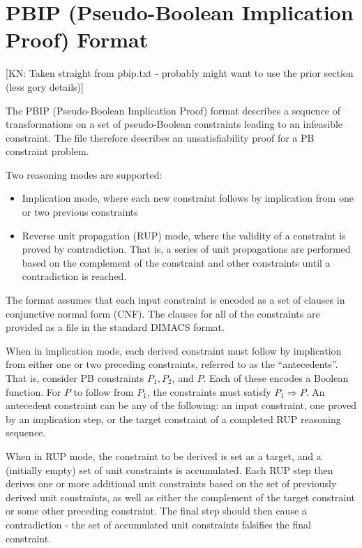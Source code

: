 \message{ !name(FMCAD2024.tex)}\documentclass{fmcad}
\begin{document}
\section{PBIP (Pseudo-Boolean Implication Proof) Format}

[KN: Taken straight from pbip.txt - probably might want to use the prior section (less gory details)]

The PBIP (Pseudo-Boolean Implication Proof) format describes a sequence of transformations on
a set of pseudo-Boolean constraints leading to an infeasible constraint. The file therefore
describes an unsatisfiability proof for a PB constraint problem.

Two reasoning modes are supported:
\begin{itemize}
\item Implication mode, where each new constraint follows by implication from one or two
  previous constraints
\item Reverse unit propagation (RUP) mode, where the validity of a constraint is proved by
  contradiction. That is, a series of unit propagations are performed based on the complement of
  the constraint and other constraints until a contradiction is reached.
\end{itemize}

The format assumes that each input constraint is encoded as a set of clauses in conjunctive normal
form (CNF). The clauses for all of the constraints are provided as a file in the standard DIMACS
format.

When in implication mode, each derived constraint must follow by implication from either one or two
preceding constraints, referred to as the ``antecedents''. That is, consider PB constraints $P_1,
P_2$, and $P$. Each of these encodes a Boolean function. For $P$ to follow from $P_1$, the constraints
must satisfy $P_1 \Longrightarrow P$. An antecedent constraint can be any of the following: an input
constraint, one proved by an implication step, or the target constraint of a completed RUP reasoning
sequence.

When in RUP mode, the constraint to be derived is set as a target, and a (initially empty) set of unit
constraints is accumulated. Each RUP step then derives one or more additional unit constraints based
on the set of previously derived unit constraints, as well as either the complement of the target
constraint or some other preceding constraint. The final step should then cause a contradiction - the
set of accumulated unit constraints falsifies the final constraint.
\end{document}

